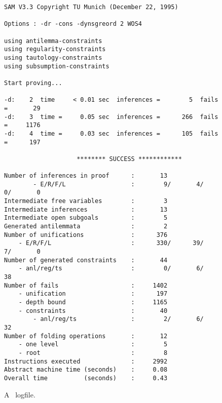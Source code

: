 \begin{figure}[htb]

\begin{verbatim}
SAM V3.3 Copyright TU Munich (December 22, 1995)

Options : -dr -cons -dynsgreord 2 WOS4 

using antilemma-constraints
using regularity-constraints
using tautology-constraints
using subsumption-constraints

Start proving...

-d:    2  time     < 0.01 sec  inferences =        5  fails =       29
-d:    3  time =     0.05 sec  inferences =      266  fails =     1176
-d:    4  time =     0.03 sec  inferences =      105  fails =      197

                    ******** SUCCESS ************

Number of inferences in proof      :       13
        - E/R/F/L                  :        9/       4/       0/       0
Intermediate free variables        :        3
Intermediate inferences            :       13
Intermediate open subgoals         :        5
Generated antilemmata              :        2
Number of unifications             :      376
    - E/R/F/L                      :      330/      39/       7/       0
Number of generated constraints    :       44
    - anl/reg/ts                   :        0/       6/      38
Number of fails                    :     1402
    - unification                  :      197
    - depth bound                  :     1165
    - constraints                  :       40
        - anl/reg/ts               :        2/       6/      32
Number of folding operations       :       12
    - one level                    :        5
    - root                         :        8
Instructions executed              :     2992
Abstract machine time (seconds)    :     0.08
Overall time          (seconds)    :     0.43
\end{verbatim}
\caption{A \SAM\ logfile.}\label{fig:logfile}
\end{figure}
